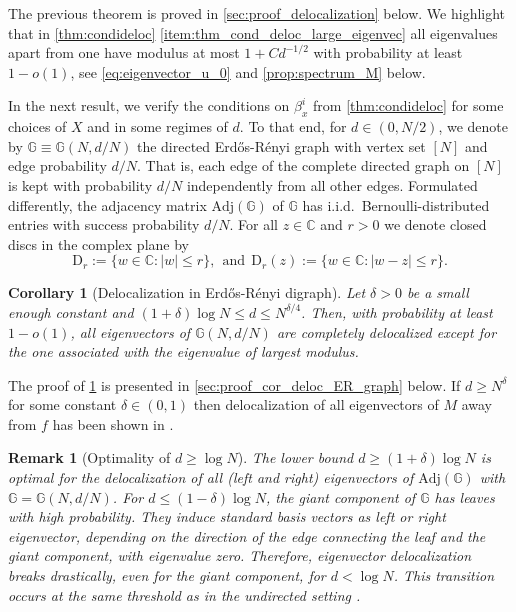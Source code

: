 \documentclass[11pt]{article}
\newcommand{\abs}[1]{\left| #1 \right|}
\newcommand{\C}{\mathbb{C}}
\theoremstyle{plain}
\newtheorem{corollary}{Corollary}[section]
\newtheorem{remark}{Remark}[section]
\theoremstyle{remark}
\numberwithin{equation}{section}
\begin{document}
	
	The previous theorem is proved in \cref{sec:proof_delocalization} below. 
	We highlight that in \cref{thm:condideloc} \cref{item:thm_cond_deloc_large_eigenvec} all eigenvalues apart from one have modulus at most $1 + Cd^{-1/2}$ 
	with probability at least $1-o(1)$, see \cref{eq:eigenvector_u_0} and \cref{prop:spectrum_M} below. 
	
	In the next result, we verify the conditions on $\beta_x^i$ from \cref{thm:condideloc} for some choices of $X$ and in some regimes of $d$.  
	To that end, for $d \in (0,N/2)$, we denote by $\mathbb{G} \equiv \mathbb{G}(N,d/N)$ the directed Erd{\H o}s-R\'enyi graph with vertex set $[N]$ and edge probability $d/N$. That is, each edge of the complete directed graph on $[N]$ is kept with probability $d/N$ independently from all other edges. Formulated differently, the adjacency matrix $\mathrm{Adj}(\mathbb G)$ of $\mathbb{G}$ has i.i.d.\ Bernoulli-distributed entries with success probability $d/N$.  For all $z \in \C$ and $r > 0$ we denote closed discs in the complex plane by 
	\begin{equation*}
		\mathrm{D}_{r}:= \{ w \in \C \colon \abs{w} \le r\}, ~~ \text{and} ~~ \mathrm{D}_r(z) :=\{ w \in \C \colon  \abs{w-z} \le r\}.
	\end{equation*}

	
	\begin{corollary}[Delocalization in Erd{\H o}s-R\'enyi digraph] \label{cor:delocalization_unconditional} 
	Let $\delta>0$ be a small enough constant and $(1+ \delta) \log N \le d \le N^{\delta/4}$. 
 Then, with probability at least $1-o(1)$, all eigenvectors of $\mathbb{G}(N,d/N)$ are completely delocalized except for the one associated with the eigenvalue of largest modulus.
	\end{corollary} 

	The proof of \cref{cor:delocalization_unconditional} is presented in \cref{sec:proof_cor_deloc_ER_graph} below.  
	If $d \geq N^\delta$ for some constant $\delta \in (0,1)$ then delocalization of all eigenvectors of $M$ away from $f$ has been shown in \cite[Theorem~1.2 (ii)]{HeDigraph}. 
	
	\begin{remark}[Optimality of $d \geq \log N$] \label{rem:leaves}
	The lower bound $d \geq (1 + \delta) \log N$ is optimal for the delocalization of all (left and right) eigenvectors of $\mathrm{Adj}(\mathbb{G})$ with $\mathbb{G} = \mathbb{G}(N,d/N)$. 
	For $d \leq (1 - \delta) \log N$, the giant component of $\mathbb{G}$ has leaves with high probability. They induce standard basis vectors as left or right eigenvector, depending on the direction of the edge connecting the leaf and the giant component, with eigenvalue zero.  Therefore, eigenvector delocalization breaks drastically, even for the giant component, 
	for $d < \log N$. This transition occurs at the same threshold as in the undirected setting \cite{alt2021delocalization,ADK_deloc_everywhere}.
	\end{remark} 
	
\end{document}
